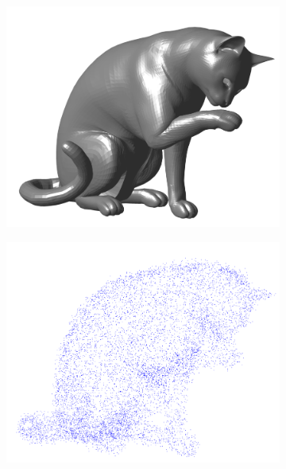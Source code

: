 \begin{figure}[ht]
	\centering
	\begin{subfigure}[t]{0.31\linewidth} \centering 
		\includegraphics[height=0.85\linewidth]{./fig/eval/cat_mesh.png} 
	\end{subfigure}
	\begin{subfigure}[t]{0.31\linewidth} \centering
		\includegraphics[height=0.85\linewidth]{./fig/eval/cat_points.png}
	\end{subfigure}

\end{figure}

